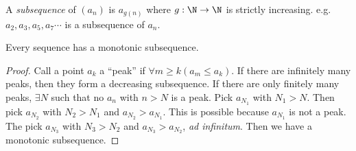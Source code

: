 \documentclass[a4paper]{article}
\begin{document}
  \begin{defi}[Subsequence]
    A \emph{subsequence} of $(a_n)$ is $a_{g(n)}$ where $g: \N\to\N$ is strictly increasing. e.g. $a_2, a_3, a_5, a_7\cdots$ is a subsequence of $a_n$.
  \end{defi}

  \begin{thm}
    Every sequence has a monotonic subsequence.
  \end{thm}

  \begin{proof}
    Call a point $a_k$ a ``peak'' if $ \forall m \geq k(a_m \leq a_k)$. If there are infinitely many peaks, then they form a decreasing subsequence. If there are only finitely many peaks, $\exists N$ such that no $a_n$ with $n > N$ is a peak. Pick $a_{N_1}$ with $N_1 > N$. Then pick $a_{N_2}$ with $N_2 > N_1$ and $a_{N_2} > a_{N_1}$. This is possible because $a_{N_1}$ is not a peak. The pick $a_{N_3}$ with $N_3 > N_2$ and $a_{N_3}> a_{N_2}$, \emph{ad infinitum}. Then we have a monotonic subsequence.
  \end{proof}
\end{document}
